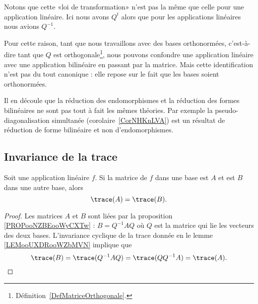 \begin{remark}
    Notons que cette «loi de transformation» n'est pas la même que celle pour une application linéaire. Ici nous avons \( Q^t\) alors que pour les applications linéaires nous avions \( Q^{-1}\).

    Pour cette raison, tant que nous travaillons avec des bases orthonormées, c'est-à-dire tant que \( Q\) est orthogonale\footnote{Définition~\ref{DefMatriceOrthogonale}.}, nous pouvons confondre une application linéaire avec une application bilinéaire en passant par la matrice. Mais cette identification n'est pas du tout canonique : elle repose sur le fait que les bases soient orthonormées.

    Il en découle que la réduction des endomorphismes et la réduction des formes bilinéaires ne sont pas tout à fait les mêmes théories. Par exemple la pseudo-diagonalisation simultanée (corolaire~\ref{CorNHKnLVA}) est un résultat de réduction de forme bilinéaire et non d'endomorphismes.
\end{remark}

\subsection{Invariance de la trace}

\begin{proposition}      \label{PROPooRMYQooWkEpJJ}
    Soit une application linéaire \( f\). Si la matrice de \( f\) dans une base est \( A\) et est \( B\) dans une autre base, alors
    \begin{equation}
        \trace(A)=\trace(B).
    \end{equation}
\end{proposition}

\begin{proof}
    Les matrices \( A\) et \( B\) sont liées par la proposition \ref{PROPooNZBEooWyCXTw} : \( B=Q^{-1}AQ\) où \( Q\) est la matrice qui lie les vecteurs des deux bases. L'invariance cyclique de la trace donnée en le lemme \ref{LEMooUXDRooWZbMVN} implique que
    \begin{equation}
        \trace(B)=\trace(Q^{-1}AQ)=\trace(QQ^{-1}A)=\trace(A).
    \end{equation}
\end{proof}



